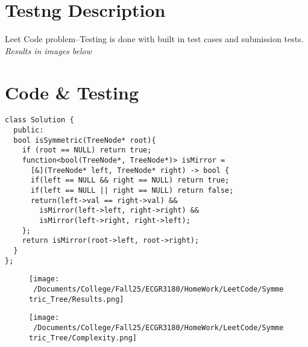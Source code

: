 \documentclass[11pt]{article}
\begin{document}
\section{Testng Description}
\label{sec:org17a25cd}
Leet Code problem--Testing is done with built in test cases and submission tests. \emph{Results in images below}
\section{Code \& Testing}
\label{sec:org44adf88}
\begin{verbatim}
class Solution {
  public:
  bool isSymmetric(TreeNode* root){
    if (root == NULL) return true;
    function<bool(TreeNode*, TreeNode*)> isMirror =
      [&](TreeNode* left, TreeNode* right) -> bool {
      if(left == NULL && right == NULL) return true;
      if(left == NULL || right == NULL) return false;
      return(left->val == right->val) &&
        isMirror(left->left, right->right) &&
        isMirror(left->right, right->left);
    };
    return isMirror(root->left, root->right);
  }
};
\end{verbatim}

\begin{figure}[H]
\centering
\texttt{[image: ~/Documents/College/Fall25/ECGR3180/HomeWork/LeetCode/Symmetric\_Tree/Results.png]}
\end{figure}

\begin{figure}[H]
\centering
\texttt{[image: ~/Documents/College/Fall25/ECGR3180/HomeWork/LeetCode/Symmetric\_Tree/Complexity.png]}
\end{figure}
\end{document}
